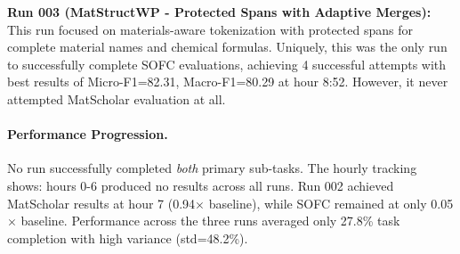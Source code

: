 \documentclass[11pt]{article}
\let\oldtexttt\texttt
\renewcommand{\texttt}[1]{{\fontseries{m}\selectfont\oldtexttt{#1}}}
\theoremstyle{plain}
\theoremstyle{definition}
\theoremstyle{remark}
\begin{document}
\textbf{Run 003 (MatStructWP - Protected Spans with Adaptive Merges):} This run focused on materials-aware tokenization with protected spans for complete material names and chemical formulas. Uniquely, this was the only run to successfully complete SOFC evaluations, achieving 4 successful attempts with best results of Micro-F1=82.31, Macro-F1=80.29 at hour 8:52. However, it never attempted MatScholar evaluation at all.

\paragraph{Performance Progression.} No run successfully completed \textit{both} primary sub-tasks. The hourly tracking shows: hours 0-6 produced no results across all runs. Run 002 achieved MatScholar results at hour 7 (0.94$\times$ baseline), while SOFC remained at only 0.05$\times$ baseline. Performance across the three runs averaged only 27.8\% task completion with high variance (std=48.2\%).



\end{document}
